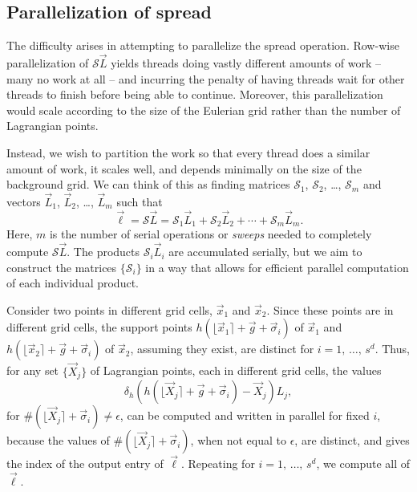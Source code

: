\subsection{Parallelization of spread}

The difficulty arises in attempting to parallelize the spread operation.
Row-wise parallelization of $\mathcal{S}\vec{L}$ yields threads doing vastly
different amounts of work -- many no work at all -- and incurring the penalty
of having threads wait for other threads to finish before being able to
continue. Moreover, this parallelization would scale according to the size of
the Eulerian grid rather than the number of Lagrangian points.

Instead, we wish to partition the work so that every thread does a similar
amount of work, it scales well, and depends minimally on the size of the
background grid. We can think of this as finding matrices $\mathcal{S}_1$,
$\mathcal{S}_2$, \dots, $\mathcal{S}_m$ and vectors $\vec{L}_1$, $\vec{L}_2$,
\dots, $\vec{L}_m$ such that
\begin{equation*}
    \vec{\ell} = \mathcal{S}\vec{L} = \mathcal{S}_1\vec{L}_1 + \mathcal{S}_2\vec{L}_2 + \cdots + \mathcal{S}_m\vec{L}_m.
\end{equation*}
Here, $m$ is the number of serial operations or \emph{sweeps} needed to
completely compute $\mathcal{S}\vec{L}$. The products $\mathcal{S}_i\vec{L}_i$
are accumulated serially, but we aim to construct the matrices
$\{\mathcal{S}_i\}$ in a way that allows for efficient parallel computation of
each individual product.

Consider two points in different grid cells, $\vec{x}_1$ and $\vec{x}_2$. Since
these points are in different grid cells, the support points
$h(\lfloor\vec{x}_1\rceil+\vec{g}+\vec{\sigma}_i)$ of $\vec{x}_1$ and 
$h(\lfloor\vec{x}_2\rceil+\vec{g}+\vec{\sigma}_i)$ of $\vec{x}_2$, assuming
they exist, are distinct for $i=1,\,\ldots,\,s^d$. Thus, for any set
$\{\vec{X}_j\}$ of Lagrangian points, each in different grid cells, the values
\begin{equation*}
    \delta_h(h(\lfloor\vec{X}_j\rceil + \vec{g}+\vec{\sigma}_i)-\vec{X}_j)L_j,
\end{equation*}
for $\#(\lfloor\vec{X}_j\rceil+\vec{\sigma}_i)\neq\epsilon$, can be computed
and written in parallel for fixed $i$, because the values of
$\#(\lfloor\vec{X}_j\rceil+\vec{\sigma}_i)$, when not equal to $\epsilon$, are
distinct, and gives the index of the output entry of $\vec{\ell}$.
Repeating for $i=1,\,\ldots,\,s^d$, we compute all of $\vec{\ell}$.

